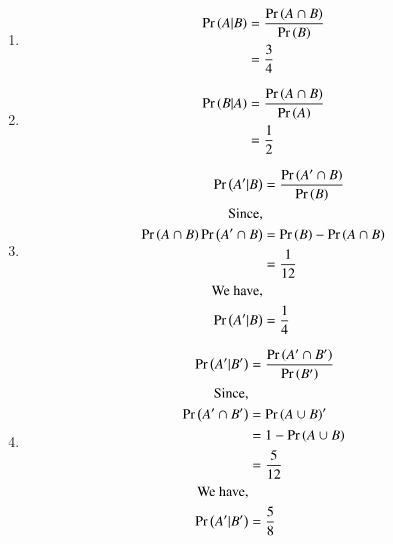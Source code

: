 \documentclass[journal,12pt,twocolumn]{IEEEtran}
\theoremstyle{remark}
\begin{document}
\begin{enumerate}
\item
\begin{equation}
\begin{split}
\Pr\left(A|B\right)&= \frac{\Pr\left(A \cap B\right)}{\Pr\left(B\right)}\\
&= \frac{3}{4}
\end{split}
\end{equation}
\item
\begin{equation}
\begin{split}
\Pr\left(B|A\right)&= \frac{\Pr\left(A \cap B\right)}{\Pr\left(A\right)}\\
&= \frac{1}{2}
\end{split}
\end{equation}
\item
\begin{equation}
\begin{split}
\Pr\left(A'|B\right)&= \frac{\Pr\left(A' \cap B\right)}{\Pr\left(B\right)}\\
\text{Since,}\\\Pr\left(A \cap B\right)
\Pr\left(A' \cap B\right)&= \Pr\left(B\right) - \Pr\left(A \cap B\right)\\
&=\frac{1}{12}\\
\text{We have,}\\
\Pr\left(A'|B\right)&= \frac{1}{4}
\end{split}
\end{equation}
\item
\begin{equation}
\begin{split}
\Pr\left(A'|B'\right)&= \frac{\Pr\left(A' \cap B'\right)}{\Pr\left(B'\right)}\\
\text{Since,}\\
\Pr\left(A' \cap B'\right)&= \Pr\left(A \cup B\right)'\\
&= 1- \Pr\left(A \cup B\right)\\
&= \frac{5}{12}\\
\text{We have,}\\
\Pr\left(A'|B'\right)&= \frac{5}{8}
\end{split}
\end{equation}
\end{enumerate}
\end{document}
